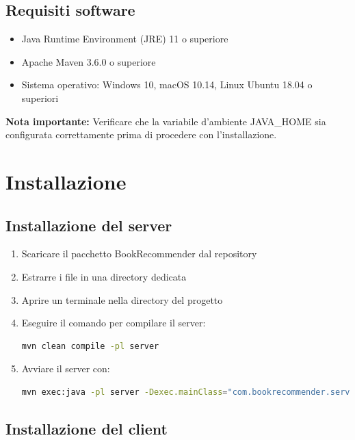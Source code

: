 \documentclass[12pt,a4paper]{article}
\begin{document}
\subsection{Requisiti software}
\begin{itemize}
    \item Java Runtime Environment (JRE) 11 o superiore
    \item Apache Maven 3.6.0 o superiore
    \item Sistema operativo: Windows 10, macOS 10.14, Linux Ubuntu 18.04 o superiori
\end{itemize}

\begin{infobox}
\textbf{Nota importante:} Verificare che la variabile d'ambiente JAVA\_HOME sia configurata correttamente prima di procedere con l'installazione.
\end{infobox}

\section{Installazione}

\subsection{Installazione del server}

\begin{enumerate}
    \item Scaricare il pacchetto BookRecommender dal repository
    \item Estrarre i file in una directory dedicata
    \item Aprire un terminale nella directory del progetto
    \item Eseguire il comando per compilare il server:
    
    \begin{lstlisting}[language=bash]
mvn clean compile -pl server
    \end{lstlisting}
    
    \item Avviare il server con:
    
    \begin{lstlisting}[language=bash]
mvn exec:java -pl server -Dexec.mainClass="com.bookrecommender.server.ServerMain"
    \end{lstlisting}
\end{enumerate}

\subsection{Installazione del client}
\end{document}
